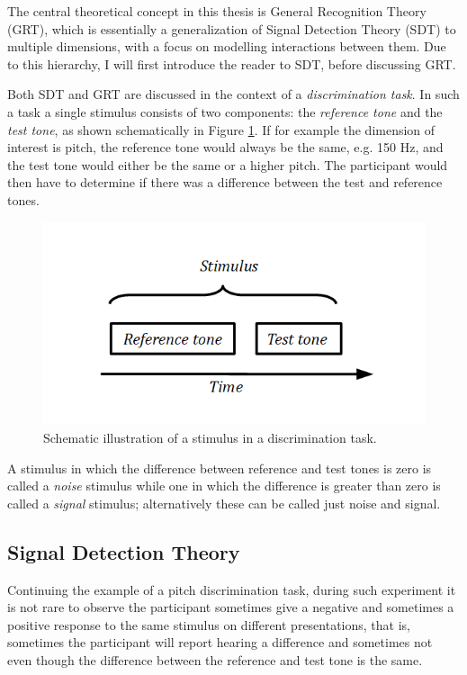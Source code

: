 \documentclass{article}\usepackage{knitr}
\begin{document}
The central theoretical concept in this thesis is General Recognition Theory (GRT), which is essentially a generalization of Signal Detection Theory (SDT) to multiple dimensions, with a focus on modelling interactions between them. Due to this hierarchy, I will first introduce the reader to SDT, before discussing GRT.

Both SDT and GRT are discussed in the context of a \textit{discrimination task}. In such a task a single stimulus consists of two components: the \textit{reference tone} and the \textit{test tone}, as shown schematically in Figure \ref{fig:discrtask}. If for example the dimension of interest is pitch, the reference tone would always be the same, e.g. 150 Hz, and the test tone would either be the same or a higher pitch. The participant would then have to determine if there was a difference between the test and reference tones.

\begin{figure}[!htb]
\centering
\includegraphics[scale = 0.5]{DiscriminationTask}
\caption{Schematic illustration of a stimulus in a discrimination task.}
\label{fig:discrtask}
\end{figure}

A stimulus in which the difference between reference and test tones is zero is called a \textit{noise} stimulus while one in which the difference is greater than zero is called a \textit{signal} stimulus; alternatively these can be called just noise and signal. 

\subsection{Signal Detection Theory}

Continuing the example of a  pitch discrimination task, during such experiment it is not rare to observe the participant sometimes give a negative and sometimes a positive response to the same stimulus on different presentations,  that is, sometimes the participant will report hearing a difference and sometimes not even though the difference between the reference and test tone is the same. 
\end{document}
